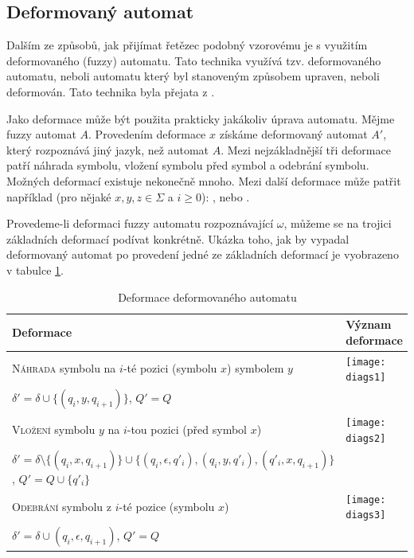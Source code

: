 \documentclass[a4paper,10pt]{article}
\begin{document}
\subsection{Deformovaný automat}
Dalším ze způsobů, jak přijímat řetězec podobný vzorovému je s využitím deformovaného (fuzzy) automatu. Tato technika využívá tzv. deformovaného automatu, neboli automatu který byl stanoveným způsobem upraven, neboli deformován. Tato technika byla přejata z \cite{AstGariGonVillFar-ApprStrMatUsiDefFuzzAutLearExpr}.

Jako deformace může být použita prakticky jakákoliv úprava automatu. Mějme fuzzy automat $A$. Provedením deformace $x$ získáme deformovaný automat $A'$, který rozpoznává jiný jazyk, než automat $A$. Mezi nejzákladnější tři deformace patří náhrada symbolu, vložení symbolu před symbol a odebrání symbolu. Možných deformací existuje nekonečně mnoho. Mezi další deformace může patřit například (pro nějaké $x, y, z \in \Sigma$ a $i \geq 0$): ,  nebo .

Provedeme-li deformaci fuzzy automatu rozpoznávající $\omega$, můžeme se na trojici základních deformací podívat konkrétně. Ukázka toho, jak by vypadal deformovaný automat po provedení jedné ze základních deformací je vyobrazeno v tabulce \ref{tbl-DefAutDef}.

\begin{table}[h]
 \begin{tabular}{|l|l|}
  \hline
  Deformace	& Význam deformace	 \\
  \hline
  \textsc{Náhrada} symbolu na $i$-té pozici (symbolu $x$) symbolem $y$ & \texttt{[image: diags1]} \\	  
    $\delta' = \delta \cup \{ (q_i, y, q_{i+1}) \}$, $Q' = Q$	&	\\
  \textsc{Vložení} symbolu $y$ na $i$-tou pozici (před symbol $x$) & \texttt{[image: diags2]} \\
    $\delta' = \delta \setminus \{ (q_i, x, q_{i+1} ) \} \cup \{ (q_i, \epsilon, q'_i), (q_i, y, q'_i), (q'_i, x, q_{i+1}) \}$, $Q' = Q \cup \{ q'_i \}$	 & \\
  \textsc{Odebrání} symbolu z $i$-té pozice (symbolu $x$) & \texttt{[image: diags3]} \\
    $\delta' = \delta \cup (q_i, \epsilon, q_{i+1})$, $Q' = Q$	 & \\
  \hline
 \end{tabular}
 \caption{Deformace deformovaného automatu}\label{tbl-DefAutDef}
\end{table}
\end{document}
